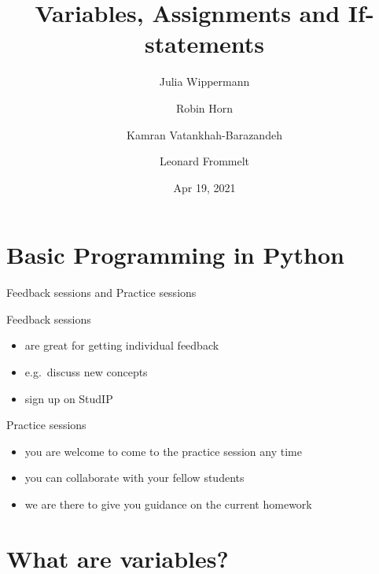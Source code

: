 \documentclass[
  american,
  ignorenonframetext,
]{beamer}
\title{Variables, Assignments and If-statements}
\author[J.~Wippermann, R.~Horn, K.~Vatankhah-Barazandeh, L.~Frommelt]{Julia Wippermann \and Robin Horn \and Kamran Vatankhah-Barazandeh \and Leonard Frommelt}
\date{Apr 19, 2021}
\providecommand{\tightlist}{%
  \setlength{\itemsep}{0pt}\setlength{\parskip}{0pt}}
\begin{document}
\frame[plain]{\titlepage}

\begin{frame}
  \tableofcontents[hideallsubsections]
\end{frame}
\hypertarget{basic-programming-in-python}{%
\section{Basic Programming in
Python}\label{basic-programming-in-python}}

\begin{frame}{Feedback sessions and Practice sessions}
\protect\hypertarget{feedback-sessions-and-practice-sessions}{}

\begin{block}{Feedback sessions}

\begin{itemize}
\tightlist
\item
  are great for getting individual feedback
\item
  e.g.~discuss new concepts
\item
  sign up on StudIP
\end{itemize}

\end{block}

\begin{block}{Practice sessions}

\begin{itemize}
\tightlist
\item
  you are welcome to come to the practice session any time
\item
  you can collaborate with your fellow students
\item
  we are there to give you guidance on the current homework
\end{itemize}

\end{block}

\end{frame}

\hypertarget{what-are-variables}{%
\section{What are variables?}\label{what-are-variables}}
\end{document}
